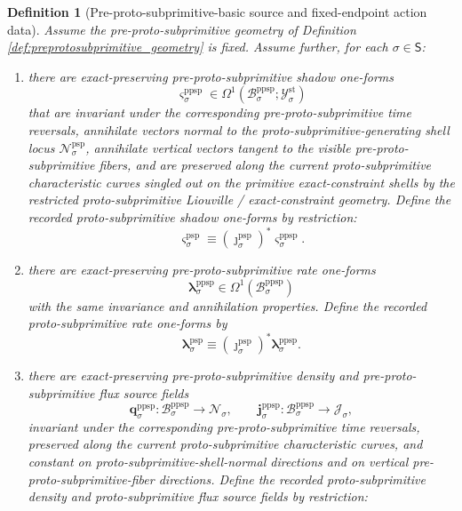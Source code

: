 \documentclass[11pt]{article}
\newcommand{\SectorSet}{\mathsf S}
\newcommand{\StatTagClass}[1]{\mathcal Y_{#1}^{\mathrm{st}}}
\newcommand{\DensityClass}[1]{\mathscr N_{#1}}
\newcommand{\FluxClass}[1]{\mathscr J_{#1}}
\newcommand{\ProtoSubprimSpace}[1]{\mathcal N_{#1}^{\mathrm{psp}}}
\newcommand{\ProtoSubprimInc}[1]{\jmath_{#1}^{\mathrm{psp}}}
\newcommand{\ProtoSubprimShadowForm}[1]{\boldsymbol{\varsigma}_{#1}^{\mathrm{psp}}}
\newcommand{\ProtoSubprimRateForm}[1]{\boldsymbol{\lambda}_{#1}^{\mathrm{psp}}}
\newcommand{\PreProtoSubprimSpace}[1]{\mathcal B_{#1}^{\mathrm{ppsp}}}
\newcommand{\PreProtoSubprimShadowForm}[1]{\boldsymbol{\varsigma}_{#1}^{\mathrm{ppsp}}}
\newcommand{\PreProtoSubprimRateForm}[1]{\boldsymbol{\lambda}_{#1}^{\mathrm{ppsp}}}
\newcommand{\PreProtoSubprimDensitySource}[1]{\boldsymbol{q}_{#1}^{\mathrm{ppsp}}}
\newcommand{\PreProtoSubprimFluxSource}[1]{\boldsymbol{j}_{#1}^{\mathrm{ppsp}}}
\newtheorem{definition}{Definition}
\begin{document}
\begin{definition}[Pre-proto-subprimitive-basic source and fixed-endpoint action data]
\label{def:preprotosubprimitive_basic}
Assume the pre-proto-subprimitive geometry of Definition \ref{def:preprotosubprimitive_geometry} is fixed. Assume further, for each \(\sigma\in\SectorSet\):
\begin{enumerate}
    \item there are exact-preserving pre-proto-subprimitive shadow one-forms
    \[
    \PreProtoSubprimShadowForm{\sigma}\in\Omega^1(\PreProtoSubprimSpace{\sigma};\StatTagClass{\sigma})
    \]
    that are invariant under the corresponding pre-proto-subprimitive time reversals, annihilate vectors normal to the proto-subprimitive-generating shell locus \(\ProtoSubprimSpace{\sigma}\), annihilate vertical vectors tangent to the visible pre-proto-subprimitive fibers, and are preserved along the current proto-subprimitive characteristic curves singled out on the primitive exact-constraint shells by the restricted proto-subprimitive Liouville / exact-constraint geometry. Define the recorded proto-subprimitive shadow one-forms by restriction:
    \begin{equation}
    \ProtoSubprimShadowForm{\sigma}\equiv (\ProtoSubprimInc{\sigma})^*\PreProtoSubprimShadowForm{\sigma}.
    \label{eq:protosubprimitive_shadow_from_preprotosubprimitive}
    \end{equation}
    \item there are exact-preserving pre-proto-subprimitive rate one-forms
    \[
    \PreProtoSubprimRateForm{\sigma}\in\Omega^1(\PreProtoSubprimSpace{\sigma})
    \]
    with the same invariance and annihilation properties. Define the recorded proto-subprimitive rate one-forms by
    \begin{equation}
    \ProtoSubprimRateForm{\sigma}\equiv (\ProtoSubprimInc{\sigma})^*\PreProtoSubprimRateForm{\sigma}.
    \label{eq:protosubprimitive_rate_from_preprotosubprimitive}
    \end{equation}
    \item there are exact-preserving pre-proto-subprimitive density and pre-proto-subprimitive flux source fields
    \[
    \PreProtoSubprimDensitySource{\sigma}:\PreProtoSubprimSpace{\sigma}\to\DensityClass{\sigma},
    \qquad
    \PreProtoSubprimFluxSource{\sigma}:\PreProtoSubprimSpace{\sigma}\to\FluxClass{\sigma},
    \]
    invariant under the corresponding pre-proto-subprimitive time reversals, preserved along the current proto-subprimitive characteristic curves, and constant on proto-subprimitive-shell-normal directions and on vertical pre-proto-subprimitive-fiber directions. Define the recorded proto-subprimitive density and proto-subprimitive flux source fields by restriction:

\end{enumerate}
\end{definition}
\end{document}
